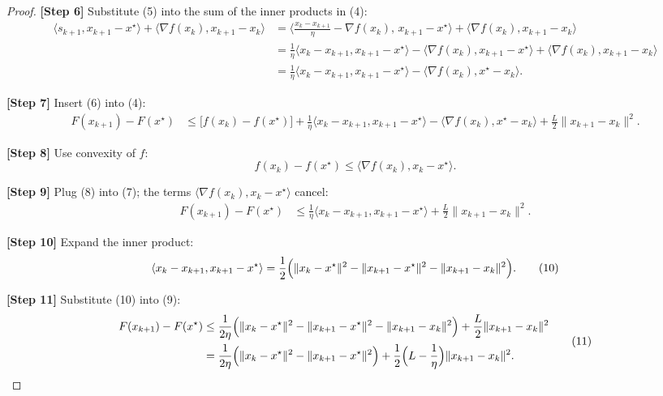 \documentclass{article}
\begin{document}
\begin{proof}
\noindent\textbf{[Step 6]}  Substitute (5) into the sum of the inner products in (4):
\[
\begin{aligned}
\langle s_{k+1},x_{k+1}-x^{\star}\rangle
+\langle\nabla f(x_{k}),x_{k+1}-x_{k}\rangle
&= \Big\langle\frac{x_{k}-x_{k+1}}{\eta}-\nabla f(x_{k}),\,x_{k+1}-x^{\star}\Big\rangle
   +\langle\nabla f(x_{k}),x_{k+1}-x_{k}\rangle\\
&= \frac{1}{\eta}\langle x_{k}-x_{k+1},x_{k+1}-x^{\star}\rangle
   -\langle\nabla f(x_{k}),x_{k+1}-x^{\star}\rangle
   +\langle\nabla f(x_{k}),x_{k+1}-x_{k}\rangle\\
&= \frac{1}{\eta}\langle x_{k}-x_{k+1},x_{k+1}-x^{\star}\rangle
   -\langle\nabla f(x_{k}),x^{\star}-x_{k}\rangle .
\end{aligned}
\tag{6}
\]

\noindent\textbf{[Step 7]}  Insert (6) into (4):
\[
\begin{aligned}
F(x_{k+1})-F(x^{\star})
&\le \bigl[f(x_{k})-f(x^{\star})\bigr]
   +\frac{1}{\eta}\langle x_{k}-x_{k+1},x_{k+1}-x^{\star}\rangle
   -\langle\nabla f(x_{k}),x^{\star}-x_{k}\rangle
   +\frac{L}{2}\|x_{k+1}-x_{k}\|^{2}.
\end{aligned}
\tag{7}
\]

\noindent\textbf{[Step 8]}  Use convexity of $f$:
\[
f(x_{k})-f(x^{\star})\le\langle\nabla f(x_{k}),x_{k}-x^{\star}\rangle.
\tag{8}
\]

\noindent\textbf{[Step 9]}  Plug (8) into (7); the terms $\langle\nabla f(x_{k}),x_{k}-x^{\star}\rangle$ cancel:
\[
\begin{aligned}
F(x_{k+1})-F(x^{\star})
&\le \frac{1}{\eta}\langle x_{k}-x_{k+1},x_{k+1}-x^{\star}\rangle
   +\frac{L}{2}\|x_{k+1}-x_{k}\|^{2}.
\end{aligned}
\tag{9}
\]

\noindent\textbf{[Step 10]}  Expand the inner product:
\[
\langle x_{k}-x_{k+1},x_{k+1}-x^{\star}\rangle
= \frac{1}{2}\Bigl(\|x_{k}-x^{\star}\|^{2}-\|x_{k+1}-x^{\star}\|^{2}-\|x_{k+1}-x_{k}\|^{2}\Bigr).
\tag{10}
\]

\noindent\textbf{[Step 11]}  Substitute (10) into (9):
\[
\begin{aligned}
F(x_{k+1})-F(x^{\star})
&\le \frac{1}{2\eta}\Bigl(\|x_{k}-x^{\star}\|^{2}-\|x_{k+1}-x^{\star}\|^{2}
                         -\|x_{k+1}-x_{k}\|^{2}\Bigr)
   +\frac{L}{2}\|x_{k+1}-x_{k}\|^{2}\\
&= \frac{1}{2\eta}\Bigl(\|x_{k}-x^{\star}\|^{2}-\|x_{k+1}-x^{\star}\|^{2}\Bigr)
   +\frac{1}{2}\Bigl(L-\frac{1}{\eta}\Bigr)\|x_{k+1}-x_{k}\|^{2}.
\end{aligned}
\tag{11}
\]


\end{proof}
\end{document}
